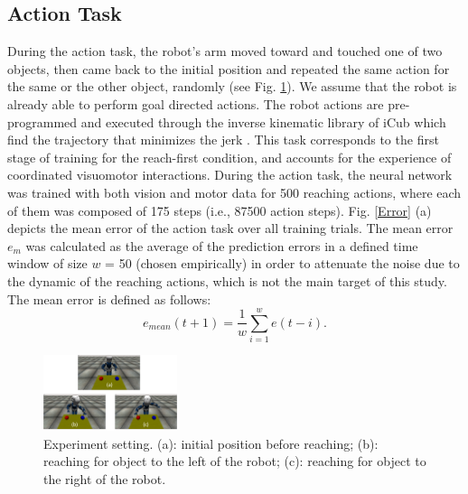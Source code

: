 \documentclass[conference]{IEEEtran}
\begin{document}
\subsection{Action Task}
During the action task, the robot's arm moved toward and touched one of two objects, then came back to the initial position and repeated the same action for the same or the other object, randomly (see Fig. \ref{iCub}). We assume that the robot is already able to perform goal directed actions. The robot actions are pre-programmed and executed through the inverse kinematic library of iCub which find the trajectory that minimizes the jerk \cite{ pattacini2010experimental}. This task corresponds to the first stage of training for the reach-first condition, and accounts for the experience of coordinated visuomotor interactions. During the action task, the neural network was trained with both vision and motor data for 500 reaching actions, where each of them was composed of 175 steps (i.e., 87500 action steps). Fig. \ref{Error} (a) depicts the mean error of the action task over all training trials. The mean error \(\textit{e}_{m}\) was calculated as the average of the prediction errors in a defined time window of size $w$ = 50 (chosen empirically) in order to attenuate the noise due to the dynamic of the reaching actions, which is not the main target of this study. The mean error is defined as follows: 
\begin{equation}
	\textit{e}_{mean}(t+1) = \frac{1}{w}\sum\limits_{i=1}^{w} \textit{e}(t - i).
\end{equation}

\begin{figure}
\centering
\includegraphics[width=0.35\textwidth,natwidth=700,natheight=450]{Simulator_light.png}
\caption{Experiment setting. (a): initial position before reaching; (b): reaching for object to the left of the robot; (c): reaching for object to the right of the robot.}
\label{iCub} 
\end{figure}
\end{document}
